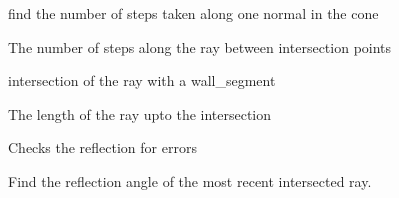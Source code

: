\documentclass[letterpaper,10pt,english]{sphinxmanual}
\begin{document}
\begin{fulllineitems}
\begin{fulllineitems}
\end{fulllineitems}


\begin{fulllineitems}
\label{index:Rays.Ray.number_cone_steps}
find the number of steps taken along one normal in the cone

\end{fulllineitems}


\begin{fulllineitems}
\label{index:Rays.Ray.number_steps}
The number of steps along the ray between intersection points

\end{fulllineitems}


\begin{fulllineitems}
\label{index:Rays.Ray.obst_collision_point}
intersection of the ray with a wall\_segment

\end{fulllineitems}


\begin{fulllineitems}
\label{index:Rays.Ray.ray_length}
The length of the ray upto the intersection

\end{fulllineitems}


\begin{fulllineitems}
\label{index:Rays.Ray.raytest}
Checks the reflection for errors

\end{fulllineitems}


\begin{fulllineitems}
\label{index:Rays.Ray.ref_angle}
Find the reflection angle of the most recent intersected ray.


\end{fulllineitems}
\end{fulllineitems}
\end{document}

